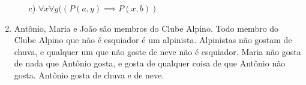 \documentclass{article}
\begin{document}
\begin{enumerate}
\begin{itemize}
        
        \item [c)] $\forall x \forall y ((P (a,y) \implies P(x,b))$
        

    \end{itemize}

    \item Antônio, Maria e João são membros do Clube Alpino. Todo membro do Clube Alpino que
    não é esquiador é um alpinista. Alpinistas não gostam de chuva, e qualquer um que não
    goste de neve não é esquiador. Maria não gosta de nada que Antônio gosta, e gosta de
    qualquer coisa de que Antônio não gosta. Antônio gosta de chuva e de neve.


\end{enumerate}
\end{document}

